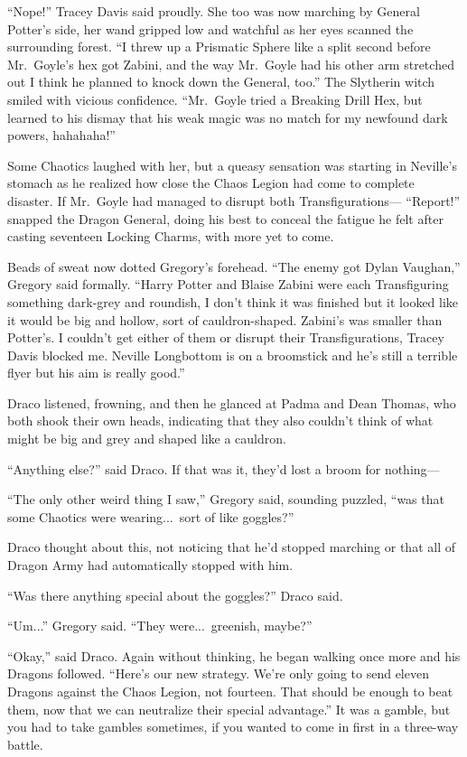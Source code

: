 “Nope!” Tracey Davis said proudly. She too was now marching by
General Potter’s side, her wand gripped low and watchful as her
eyes scanned the surrounding forest. “I threw up a Prismatic Sphere
like a split second before Mr.~Goyle’s hex got Zabini, and the way
Mr.~Goyle had his other arm stretched out I think he planned to
knock down the General, too.” The Slytherin witch smiled with
vicious confidence. “Mr.~Goyle tried a Breaking Drill Hex, but
learned to his dismay that his weak magic was no match for my
newfound dark powers, hahahaha!”

Some Chaotics laughed with her, but a queasy sensation was
starting in Neville’s stomach as he realized how close the Chaos
Legion had come to complete disaster. If Mr.~Goyle had managed to
disrupt both Transfigurations—
\sbreak
“Report!” snapped the Dragon General, doing his best to conceal
the fatigue he felt after casting seventeen Locking Charms, with
more yet to come.

Beads of sweat now dotted Gregory’s forehead. “The enemy got
Dylan Vaughan,” Gregory said formally. “Harry Potter and Blaise
Zabini were each Transfiguring something dark-grey and roundish, I
don’t think it was finished but it looked like it would be big and
hollow, sort of cauldron-shaped. Zabini’s was smaller than
Potter’s. I couldn’t get either of them or disrupt their
Transfigurations, Tracey Davis blocked me. Neville Longbottom is on
a broomstick and he’s still a terrible flyer but his aim is really
good.”

Draco listened, frowning, and then he glanced at Padma and Dean
Thomas, who both shook their own heads, indicating that they also
couldn’t think of what might be big and grey and shaped like a
cauldron.

“Anything else?” said Draco. If that was it, they’d lost a broom
for nothing—

“The only other weird thing I saw,” Gregory said, sounding
puzzled, “was that some Chaotics were wearing...\ sort of like
goggles?”

Draco thought about this, not noticing that he’d stopped
marching or that all of Dragon Army had automatically stopped with
him.

“Was there anything special about the goggles?” Draco said.

“Um...” Gregory said. “They were...\ greenish, maybe?”

“Okay,” said Draco. Again without thinking, he began walking
once more and his Dragons followed. “Here’s our new strategy. We’re
only going to send eleven Dragons against the Chaos Legion, not
fourteen. That should be enough to beat them, now that we can
neutralize their special advantage.” It was a gamble, but you had
to take gambles sometimes, if you wanted to come in first in a
three-way battle.

